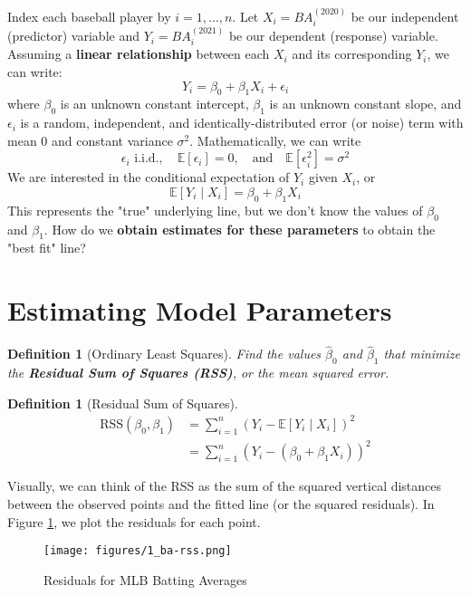 \documentclass[twoside]{article}
\newtheorem{definition}[theorem]{Definition}
\theoremstyle{definition}
\begin{document}
Index each baseball player by $i = 1, \ldots, n$. Let $X_i = BA_{i}^{(2020)}$ be our independent (predictor) variable and $Y_i = BA_{i}^{(2021)}$ be our dependent (response) variable. Assuming a \textbf{linear relationship} between each $X_i$ and its corresponding $Y_i$, we can write:
\begin{equation}
    Y_i = \beta_0 + \beta_1 X_i + \epsilon_i
\end{equation}
where $\beta_0$ is an unknown constant intercept, $\beta_1$ is an unknown constant slope, and $\epsilon_i$ is a random, independent, and identically-distributed error (or noise) term with mean $0$ and constant variance $\sigma^2$. Mathematically, we can write
\begin{equation}
    \epsilon_i \text{ i.i.d.}, \quad \mathbb{E}[\epsilon_i] = 0, \quad \text{and} \quad \mathbb{E}[\epsilon_i^2] = \sigma^2
\end{equation}
We are interested in the conditional expectation of $Y_i$ given $X_i$, or
\begin{equation}
    \mathbb{E}[Y_i \mid X_i] = \beta_0 + \beta_1 X_i
\end{equation}
This represents the "true" underlying line, but we don't know the values of $\beta_0$ and $\beta_1$. How do we \textbf{obtain estimates for these parameters} to obtain the "best fit" line?

\section{Estimating Model Parameters}

\begin{definition}[Ordinary Least Squares]
Find the values $\widehat{\beta}_0$ and $\widehat{\beta}_1$ that minimize the \textbf{Residual Sum of Squares (RSS)}, or the mean squared error.
\end{definition}
\begin{definition}[Residual Sum of Squares]
\begin{align}
    \text{RSS}(\beta_0, \beta_1) &= \sum_{i=1}^n (Y_i - \mathbb{E}[Y_i \mid X_i])^2 \nonumber \\
    &= \sum_{i=1}^n (Y_i - (\beta_0 + \beta_1 X_i))^2
\end{align}
\end{definition}
Visually, we can think of the RSS as the sum of the squared vertical distances between the observed points and the fitted line (or the squared residuals). In Figure \ref{fig:ba-rss}, we plot the residuals for each point. 
\begin{figure}[H]
    \centering
    \texttt{[image: figures/1\_ba-rss.png]}
    \caption{Residuals for MLB Batting Averages}
    \label{fig:ba-rss}
\end{figure}
\end{document}
